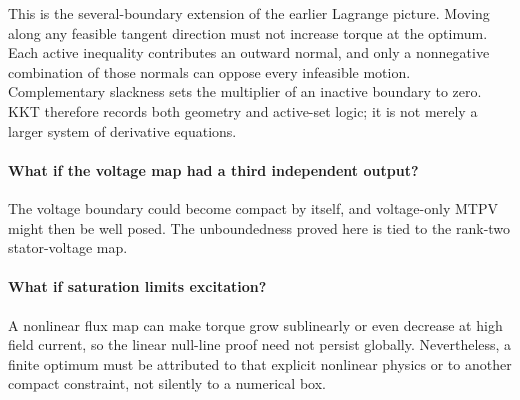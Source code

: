 This is the several-boundary extension of the earlier Lagrange picture.
Moving along any feasible tangent direction must not increase torque at the
optimum.  Each active inequality contributes an outward normal, and only a
nonnegative combination of those normals can oppose every infeasible motion.
Complementary slackness sets the multiplier of an inactive boundary to zero.
KKT therefore records both geometry and active-set logic; it is not merely a
larger system of derivative equations.



\paragraph{What if the voltage map had a third independent output?}
The voltage boundary could become compact by itself, and voltage-only MTPV
might then be well posed.  The unboundedness proved here is tied to the
rank-two stator-voltage map.

\paragraph{What if saturation limits excitation?}
A nonlinear flux map can make torque grow sublinearly or even decrease at high
field current, so the linear null-line proof need not persist globally.
Nevertheless, a finite optimum must be attributed to that explicit nonlinear
physics or to another compact constraint, not silently to a numerical box.
